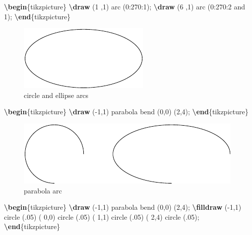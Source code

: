 \documentclass[
]{book}
\newenvironment{Shaded}{\begin{snugshade}}{\end{snugshade}}
\newcommand{\ExtensionTok}[1]{#1}
\newcommand{\FunctionTok}[1]{\textcolor[rgb]{0.13,0.29,0.53}{\textbf{#1}}}
\newcommand{\KeywordTok}[1]{\textcolor[rgb]{0.13,0.29,0.53}{\textbf{#1}}}
\newcommand{\NormalTok}[1]{#1}
\theoremstyle{definition}
\theoremstyle{definition}
\theoremstyle{definition}
\theoremstyle{definition}
\theoremstyle{remark}
\begin{document}
\begin{Shaded}
\begin{Highlighting}[]
\KeywordTok{\textbackslash{}begin}\NormalTok{\{}\ExtensionTok{tikzpicture}\NormalTok{\}}
  \FunctionTok{\textbackslash{}draw}\NormalTok{ (1 ,1) arc (0:270:1);}
  \FunctionTok{\textbackslash{}draw}\NormalTok{ (6 ,1) arc (0:270:2 and 1);}
\KeywordTok{\textbackslash{}end}\NormalTok{\{}\ExtensionTok{tikzpicture}\NormalTok{\}}
\end{Highlighting}
\end{Shaded}

\begin{figure}
\includegraphics[width=0.25\linewidth]{202401311000-TikZ_files/figure-latex/unnamed-chunk-28-1} \caption{circle and ellipse arcs}\label{fig:unnamed-chunk-28}
\end{figure}

\begin{Shaded}
\begin{Highlighting}[]
\KeywordTok{\textbackslash{}begin}\NormalTok{\{}\ExtensionTok{tikzpicture}\NormalTok{\}}
  \FunctionTok{\textbackslash{}draw}\NormalTok{ ({-}1,1) parabola bend (0,0) (2,4);}
\KeywordTok{\textbackslash{}end}\NormalTok{\{}\ExtensionTok{tikzpicture}\NormalTok{\}}
\end{Highlighting}
\end{Shaded}

\begin{figure}
\includegraphics[width=0.25\linewidth]{202401311000-TikZ_files/figure-latex/unnamed-chunk-30-1} \caption{parabola arc}\label{fig:unnamed-chunk-30}
\end{figure}

\begin{Shaded}
\begin{Highlighting}[]
\KeywordTok{\textbackslash{}begin}\NormalTok{\{}\ExtensionTok{tikzpicture}\NormalTok{\}}
  \FunctionTok{\textbackslash{}draw}\NormalTok{ ({-}1,1) parabola bend (0,0) (2,4);}
  \FunctionTok{\textbackslash{}filldraw}
\NormalTok{    ({-}1,1) circle (.05)}
\NormalTok{    ( 0,0) circle (.05)}
\NormalTok{    ( 1,1) circle (.05)}
\NormalTok{    ( 2,4) circle (.05);}
\KeywordTok{\textbackslash{}end}\NormalTok{\{}\ExtensionTok{tikzpicture}\NormalTok{\}}
\end{Highlighting}
\end{Shaded}
\end{document}
